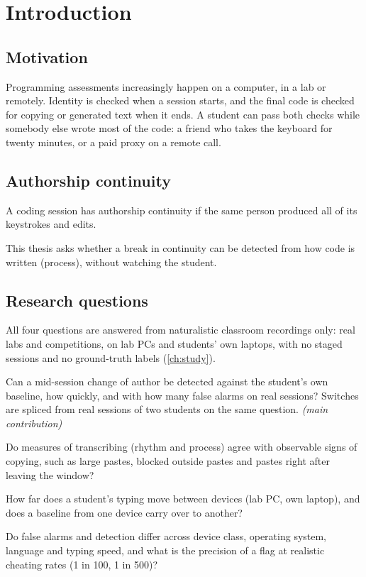 \chapter{Introduction}
\label{ch:intro}

\section{Motivation}
Programming assessments increasingly happen on a computer, in a lab or
remotely. Identity is checked when a session starts, and the final code is
checked for copying or generated text when it ends. A student can pass both
checks while somebody else wrote most of the code: a friend who takes the
keyboard for twenty minutes, or a paid proxy on a remote call.

\section{Authorship continuity}
\begin{definition}
A coding session has authorship continuity if the same person produced all
of its keystrokes and edits.
\end{definition}
This thesis asks whether a break in continuity can be detected from how
code is written (process), without watching the student.

\section{Research questions}
All four questions are answered from naturalistic classroom recordings only: real
labs and competitions, on lab PCs and students' own laptops, with no staged sessions
and no ground-truth labels (\cref{ch:study}).
\begin{description}[leftmargin=2.5em]
  \item[\RQ{1}] Can a mid-session change of author be detected against the
    student's own baseline, how quickly, and with how many false alarms on real
    sessions? Switches are spliced from real sessions of two students on the same
    question. \emph{(main contribution)}
  \item[\RQ{2}] Do measures of transcribing (rhythm and process) agree with
    observable signs of copying, such as large pastes, blocked outside pastes and
    pastes right after leaving the window?
  \item[\RQ{3}] How far does a student's typing move between devices (lab PC,
    own laptop), and does a baseline from one device carry over to another?
  \item[\RQ{4}] Do false alarms and detection differ across device class,
    operating system, language and typing speed, and what is the precision of a
    flag at realistic cheating rates (1 in 100, 1 in 500)?
\end{description}

